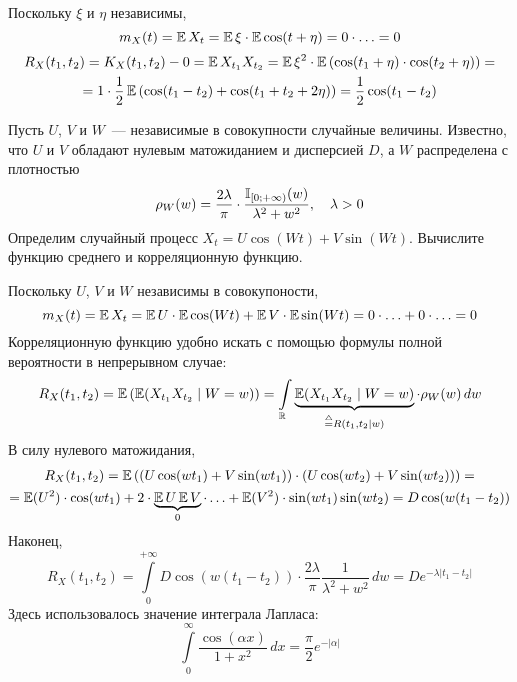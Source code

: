 \begin{Answer}
    \noindent
    Поскольку $ \xi $ и $ \eta $ независимы,
    \[
        m_X(t) = \operatorname{\mathbb{E}} X_t = \operatorname{\mathbb{E}} \xi \cdot \operatorname{\mathbb{E}} \cos(t + \eta) = 0 \cdot \ldots = 0
    \]
    \begin{multline*}
        R_X(t_1, t_2) = K_X(t_1, t_2) - 0 = \operatorname{\mathbb{E}} X_{t_1} X_{t_2} = \operatorname{\mathbb{E}} \xi^2 \cdot \operatorname{\mathbb{E}} \left( \cos(t_1 + \eta) \cdot \cos(t_2 + \eta) \right) = \\
        = 1 \cdot \frac{1}{2} \operatorname{\mathbb{E}} \left( \cos(t_1 - t_2) + \cos(t_1 + t_2 + 2 \eta) \right) = \frac{1}{2} \cos(t_1 - t_2)
    \end{multline*}
\end{Answer}

\begin{Exercise}[counter=SecExercise, label={exercise:basics:cos_and_sin}]
    \noindent
    Пусть $ U $, $ V $ и $ W $~--- независимые в совокупности случайные величины.
    Известно, что $ U $ и $ V $ обладают нулевым матожиданием и дисперсией $ D $,
    а $ W $ распределена с плотностью
    \[
        \rho_W(w) = \frac{2 \lambda}{\pi} \cdot \frac{\mathbb{I}_{[0; +\infty)}(w)}{\lambda^2 + w^2}, \quad \lambda > 0
    \]
    Определим случайный процесс $ X_t = U \cos(W t) + V \sin(W t) $.
    Вычислите функцию среднего и корреляционную функцию.
\end{Exercise}

\begin{Answer}
    \noindent
    Поскольку $ U $, $ V $ и $ W $ независимы в совокупоности,
    \[
        m_X(t) = \operatorname{\mathbb{E}} X_t = \operatorname{\mathbb{E}} U \cdot \operatorname{\mathbb{E}} \cos(W t) + \operatorname{\mathbb{E}} V \cdot \operatorname{\mathbb{E}} \sin(W t) = 0 \cdot \ldots + 0 \cdot \ldots = 0
    \]
    Корреляционную функцию удобно искать с помощью формулы полной вероятности в непрерывном случае:
    \[
        R_X(t_1, t_2) = \operatorname{\mathbb{E}} \left( \operatorname{\mathbb{E}}(X_{t_1} X_{t_2} \mid W = w) \right) = \int\limits_{\mathbb{R}} \underbrace{\operatorname{\mathbb{E}}(X_{t_1} X_{t_2} \mid W = w)}_{\overset{\triangle}{=} R(t_1, t_2 \mid w)} \cdot \rho_W(w) \, dw
    \]
    В силу нулевого матожидания,
    \begin{multline*}
        R_X(t_1, t_2) = \operatorname{\mathbb{E}} \left( (U \cos(w t_1) + V \sin(w t_1)) \cdot (U \cos(w t_2) + V \sin(w t_2)) \right) = \\
        = \operatorname{\mathbb{E}} (U^2) \cdot \cos(w t_1) + 2 \cdot \underbrace{\operatorname{\mathbb{E}} U \operatorname{\mathbb{E}} V}_{0} \cdot \ldots + \operatorname{\mathbb{E}} (V^2) \cdot \sin(w t_1) \sin(w t_2) = D \cos(w(t_1 - t_2))
    \end{multline*}
    Наконец,
    \[
        R_X(t_1, t_2) = \int\limits_0^{+\infty} D \cos(w(t_1 - t_2)) \cdot \frac{2 \lambda}{\pi} \frac{1}{\lambda^2 + w^2} \, dw = D e^{-\lambda |t_1 - t_2|}
    \]
    Здесь использовалось значение интеграла Лапласа:
    \[
        \int\limits_0^\infty \frac{\cos(\alpha x)}{1 + x^2} \, dx = \frac{\pi}{2} e^{-|\alpha|}
    \]
\end{Answer}



